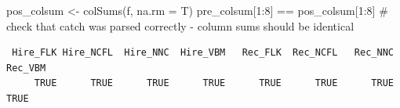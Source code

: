 \documentclass[
  letterpaper,
  oneside,
  open=any]{scrbook}
\newenvironment{Shaded}{\begin{snugshade}}{\end{snugshade}}
\newcommand{\AttributeTok}[1]{\textcolor[rgb]{0.40,0.45,0.13}{#1}}
\newcommand{\CommentTok}[1]{\textcolor[rgb]{0.37,0.37,0.37}{#1}}
\newcommand{\DecValTok}[1]{\textcolor[rgb]{0.68,0.00,0.00}{#1}}
\newcommand{\FunctionTok}[1]{\textcolor[rgb]{0.28,0.35,0.67}{#1}}
\newcommand{\NormalTok}[1]{\textcolor[rgb]{0.00,0.23,0.31}{#1}}
\newcommand{\OtherTok}[1]{\textcolor[rgb]{0.00,0.23,0.31}{#1}}
\newcommand{\SpecialCharTok}[1]{\textcolor[rgb]{0.37,0.37,0.37}{#1}}
\begin{document}
\begin{Shaded}
\begin{Highlighting}[]
\NormalTok{pos\_colsum }\OtherTok{\textless{}{-}} \FunctionTok{colSums}\NormalTok{(f, }\AttributeTok{na.rm =}\NormalTok{ T) }
\NormalTok{pre\_colsum[}\DecValTok{1}\SpecialCharTok{:}\DecValTok{8}\NormalTok{] }\SpecialCharTok{==}\NormalTok{ pos\_colsum[}\DecValTok{1}\SpecialCharTok{:}\DecValTok{8}\NormalTok{]  }\CommentTok{\# check that catch was parsed correctly {-} column sums should be identical }
\end{Highlighting}
\end{Shaded}

\begin{verbatim}
 Hire_FLK Hire_NCFL  Hire_NNC  Hire_VBM   Rec_FLK  Rec_NCFL   Rec_NNC   Rec_VBM 
     TRUE      TRUE      TRUE      TRUE      TRUE      TRUE      TRUE      TRUE 
\end{verbatim}
\end{document}
